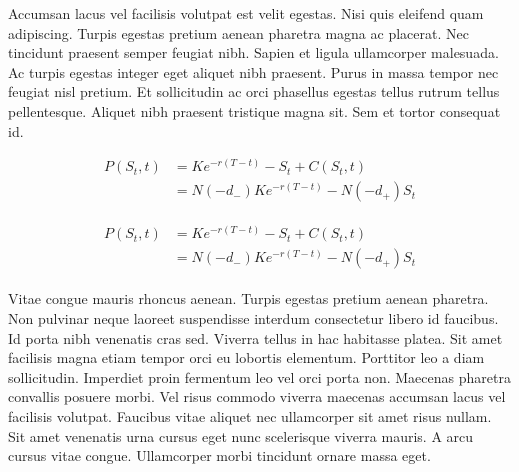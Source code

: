 Accumsan lacus vel facilisis volutpat est velit egestas. Nisi quis eleifend
quam adipiscing. Turpis egestas pretium aenean pharetra magna ac placerat.
Nec tincidunt praesent semper feugiat nibh. Sapien et ligula ullamcorper
malesuada. Ac turpis egestas integer eget aliquet nibh praesent. Purus in
massa tempor nec feugiat nisl pretium. Et sollicitudin ac orci phasellus
egestas tellus rutrum tellus pellentesque. Aliquet nibh praesent tristique
magna sit. Sem et tortor consequat id.

\begin{align}
P(S_t, t) &= Ke^{-r(T - t)} - S_t + C(S_t, t)   \label{eq:align1}\\
          &= N(-d_-) Ke^{-r(T - t)} - N(-d_+) S_t \label{eq:align2}
\end{align}



%
%
\begin{align}
\begin{split}
P(S_t, t) &= Ke^{-r(T - t)} - S_t + C(S_t, t)   \\
          &= N(-d_-) Ke^{-r(T - t)} - N(-d_+) S_t 
\end{split}
\label{eq:align-share}
\end{align}



Vitae congue mauris rhoncus aenean. Turpis egestas pretium aenean pharetra.
Non pulvinar neque laoreet suspendisse interdum consectetur libero id
faucibus. Id porta nibh venenatis cras sed. Viverra tellus in hac habitasse
platea. Sit amet facilisis magna etiam tempor orci eu lobortis elementum.
Porttitor leo a diam sollicitudin. Imperdiet proin fermentum leo vel orci
porta non. Maecenas pharetra convallis posuere morbi. Vel risus commodo
viverra maecenas accumsan lacus vel facilisis volutpat. Faucibus vitae
aliquet nec ullamcorper sit amet risus nullam. Sit amet venenatis urna cursus
eget nunc scelerisque viverra mauris. A arcu cursus vitae congue. Ullamcorper
morbi tincidunt ornare massa eget.
%


